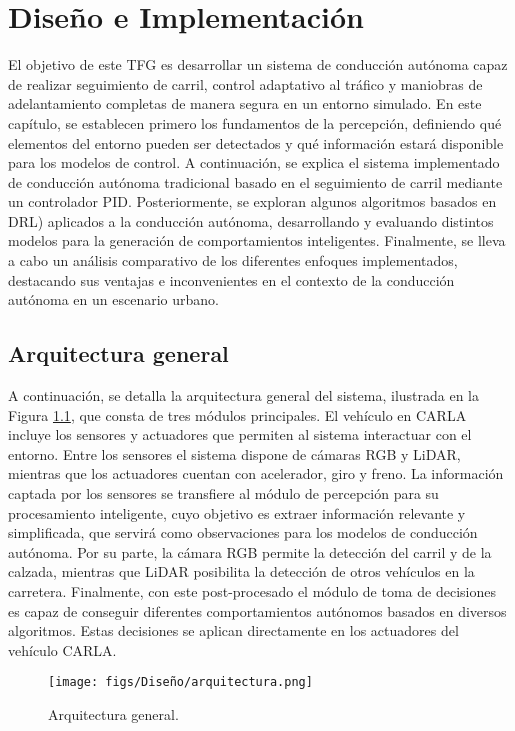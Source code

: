 \chapter{Diseño e Implementación}
\label{cap:capitulo4}

El objetivo de este \ac{TFG} es desarrollar un sistema de conducción autónoma capaz de realizar seguimiento de carril, control adaptativo al tráfico y maniobras de adelantamiento completas de manera segura en un entorno simulado. En este capítulo, se establecen primero los fundamentos de la percepción, definiendo qué elementos del entorno pueden ser detectados y qué información estará disponible para los modelos de control. A continuación, se explica el sistema implementado de conducción autónoma tradicional basado en el seguimiento de carril mediante un controlador \ac{PID}. Posteriormente, se exploran algunos algoritmos basados en \ac{DRL}) aplicados a la conducción autónoma, desarrollando y evaluando distintos modelos para la generación de comportamientos inteligentes. Finalmente, se lleva a cabo un análisis comparativo de los diferentes enfoques implementados, destacando sus ventajas e inconvenientes en el contexto de la conducción autónoma en un escenario urbano.

\section{Arquitectura general}

A continuación, se detalla la arquitectura general del sistema, ilustrada en la Figura \ref{fig:arch}, que consta de tres módulos principales. El vehículo en CARLA incluye los sensores y actuadores que permiten al sistema interactuar con el entorno. Entre los sensores el sistema dispone de cámaras RGB y \ac{LiDAR}, mientras que los actuadores cuentan con acelerador, giro y freno. La información captada por los sensores se transfiere al módulo de percepción para su procesamiento inteligente, cuyo objetivo es extraer información relevante y simplificada, que servirá como observaciones para los modelos de conducción autónoma. Por su parte, la cámara RGB permite la detección del carril y de la calzada, mientras que \ac{LiDAR} posibilita la detección de otros vehículos en la carretera. Finalmente, con este post-procesado el módulo de toma de decisiones es capaz de conseguir diferentes comportamientos autónomos basados en diversos algoritmos. Estas decisiones se aplican directamente en los actuadores del vehículo CARLA.

\begin{figure}[ht]
  \centering
  \texttt{[image: figs/Diseño/arquitectura.png]}
  \caption{Arquitectura general.}
  \label{fig:arch}
\end{figure}

